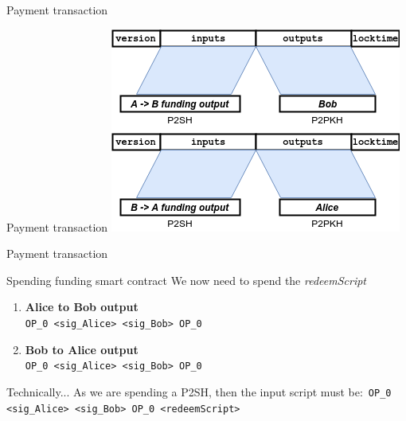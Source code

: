 \documentclass{beamer}
\begin{document}
\begin{frame}{Payment transaction}
 \begin{exampleblock}{Payment transaction}
  \includegraphics[width=\textwidth, height=0.8\textheight, keepaspectratio]{img/bidir_tx_payment.png}
 \end{exampleblock}
\end{frame}
\begin{frame}{Payment transaction}
 \begin{exampleblock}{Spending funding smart contract}
  We now need to spend the \textit{redeemScript}
  \pause
  \begin{center}
   \begin{enumerate}[<+->]
    \item \textbf{Alice to Bob output}\\
          \small{\texttt{OP\_0 <sig\_Alice> <sig\_Bob> OP\_0}}
    \item \textbf{Bob to Alice output}\\
          \small{\texttt{OP\_0 <sig\_Alice> <sig\_Bob> OP\_0}}
   \end{enumerate}
  \end{center}
 \end{exampleblock}
 \begin{exampleblock}{Technically...}
  As we are spending a P2SH, then the input script must be:\
  \texttt{OP\_0 <sig\_Alice> <sig\_Bob> OP\_0 <redeemScript>}
 \end{exampleblock}
\end{frame}
\end{document}
